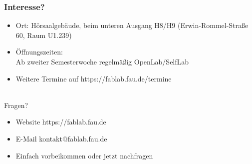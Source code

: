 \documentclass[t]{beamer}
\begin{document}
\begin{frame}
    \frametitle{Interesse?}

    \begin{itemize}
        \item Ort: Hörsaalgebäude, beim unteren Ausgang H8/H9 (Erwin-Rommel-Straße 60, Raum U1.239)
        \item Öffnungszeiten: \\Ab zweiter Semesterwoche regelmäßig OpenLab/SelfLab
        \item Weitere Termine auf {\color{blue} https://fablab.fau.de/termine}
    \end{itemize}
    ~\\
    Fragen?
    \begin{itemize}
        \item Website {\color{blue} https://fablab.fau.de}
        \item E-Mail {\color{blue} kontakt@fablab.fau.de}
        \item Einfach vorbeikommen oder jetzt nachfragen
    \end{itemize}
\end{frame}
\end{document}
